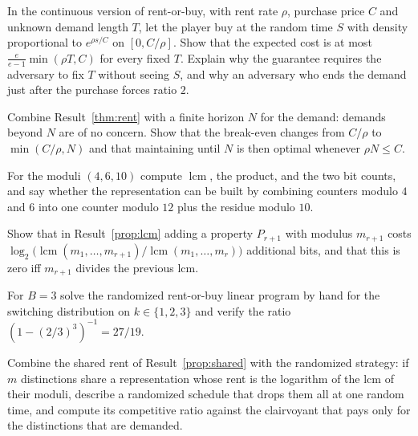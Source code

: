 \begin{exercise}
In the continuous version of rent-or-buy, with rent rate $\rho$, purchase price $C$ and unknown demand length $T$, let the player buy at the random time $S$ with density proportional to $e^{\rho s/C}$ on $[0,C/\rho]$. Show that the expected cost is at most $\tfrac{e}{e-1}\min(\rho T,C)$ for every fixed $T$. Explain why the guarantee requires the adversary to fix $T$ without seeing $S$, and why an adversary who ends the demand just after the purchase forces ratio $2$.
\end{exercise}

\begin{exercise}
Combine Result~\ref{thm:rent} with a finite horizon $N$ for the demand: demands beyond $N$ are of no concern. Show that the break-even changes from $C/\rho$ to $\min(C/\rho,N)$ and that maintaining until $N$ is then optimal whenever $\rho N\le C$.
\end{exercise}

\begin{exercise}
For the moduli $(4,6,10)$ compute $\operatorname{lcm}$, the product, and the two bit counts, and say whether the representation can be built by combining counters modulo $4$ and $6$ into one counter modulo $12$ plus the residue modulo $10$.
\end{exercise}

\begin{exercise}
Show that in Result~\ref{prop:lcm} adding a property $P_{r+1}$ with modulus $m_{r+1}$ costs $\log_2\bigl(\operatorname{lcm}(m_1,\dots,m_{r+1})/\operatorname{lcm}(m_1,\dots,m_r)\bigr)$ additional bits, and that this is zero iff $m_{r+1}$ divides the previous lcm.\label{ex2:lcm-bits}
\end{exercise}

\begin{exercise}
For $B=3$ solve the randomized rent-or-buy linear program by hand for the switching distribution on $k\in\{1,2,3\}$ and verify the ratio $(1-(2/3)^3)^{-1}=27/19$.\label{ex2:ski-27}
\end{exercise}

\begin{exercise}
Combine the shared rent of Result~\ref{prop:shared} with the randomized strategy: if $m$ distinctions share a representation whose rent is the logarithm of the lcm of their moduli, describe a randomized schedule that drops them all at one random time, and compute its competitive ratio against the clairvoyant that pays only for the distinctions that are demanded.
\end{exercise}

